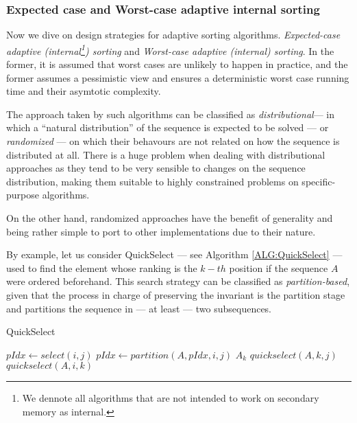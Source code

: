 \subsubsection{Expected case and Worst-case adaptive internal sorting}

Now we dive on design strategies for adaptive sorting algorithms. \textit{Expected-case adaptive (internal\footnote{We dennote all algorithms that are not intended to work on secondary memory as internal.}) sorting} and \textit{Worst-case adaptive (internal) sorting}. In the former, it is assumed that worst cases are unlikely to happen in practice, and the former assumes a pessimistic view and ensures a deterministic worst case running time and their asymtotic complexity.

The approach taken by such algorithms can be classified as \textit{distributional}--- in which a ``natural distribution'' of the sequence is expected to be solved --- or \textit{randomized} --- on which their behavours are not related on how the sequence is distributed at all. There is a huge problem when dealing with distributional approaches as they tend to be very sensible to changes on the sequence distribution, making them suitable to highly constrained problems on specific-purpose algorithms.

On the other hand, randomized approaches have the benefit of generality and being rather simple to port to other implementations due to their nature.

By example, let us consider QuickSelect --- see Algorithm \ref{ALG:QuickSelect} --- used to find the element whose ranking is the $k-th$ position if the sequence $A$ were ordered beforehand. This search strategy can be classified as \textit{partition-based}, given that the process in charge of preserving the invariant is the partition stage and partitions the sequence in --- at least --- two subsequences.


\begin{algorithm}
  \caption{QuickSelect}\label{ALG:QuickSelect}
  \begin{algorithmic}[1]
    \State $pIdx \gets select(i,j)$
    \State $pIdx \gets partition(A,pIdx,i,j)$
     \Return $A_k$
    \EndIf
     \Return $quickselect(A, k, j)$
    \EndIf
     \Return $quickselect(A, i, k)$
    \EndIf
    \EndProcedure
  \end{algorithmic}
\end{algorithm}

